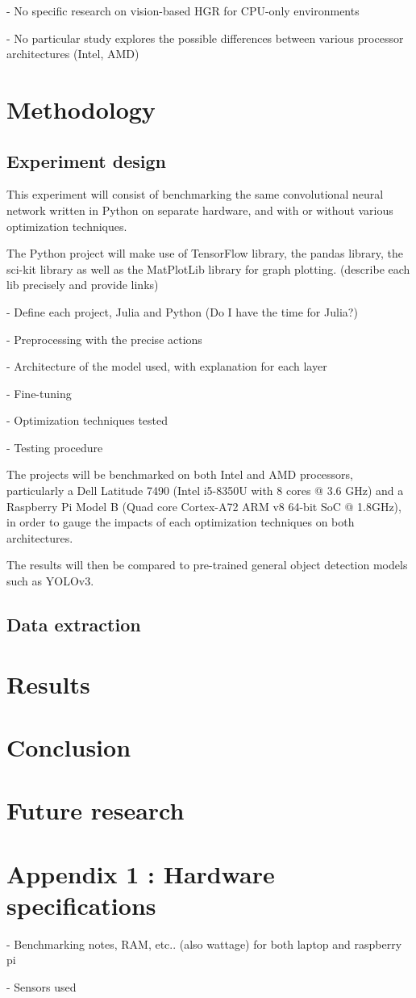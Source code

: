 \documentclass[12pt]{article}
\begin{document}
  - No specific research on vision-based HGR for CPU-only environments

  - No particular study explores the possible differences between various processor architectures (Intel, AMD)

  \section{Methodology}

  \subsection{Experiment design}

  This experiment will consist of benchmarking the same convolutional neural network written in Python on separate hardware, and with or without various optimization techniques.

  The Python project will make use of TensorFlow library, the pandas library, the sci-kit library as well as the MatPlotLib library for graph plotting.
  (describe each lib precisely and provide links)

  - Define each project, Julia and Python (Do I have the time for Julia?)

  - Preprocessing with the precise actions

  - Architecture of the model used, with explanation for each layer

  - Fine-tuning

  - Optimization techniques tested

  - Testing procedure

  The projects will be benchmarked on both Intel and AMD processors, particularly a Dell Latitude 7490 (Intel i5-8350U with 8 cores @ 3.6 GHz) and a Raspberry Pi Model B (Quad core Cortex-A72 ARM v8 64-bit SoC @ 1.8GHz), in order to gauge the impacts of each optimization techniques on both architectures.

  The results will then be compared to pre-trained general object detection models such as YOLOv3.

  \subsection{Data extraction}

  \section{Results}

  \section{Conclusion}

  \section{Future research}

  \section{Appendix 1 : Hardware specifications}

  - Benchmarking notes, RAM, etc.. (also wattage) for both laptop and raspberry pi

  - Sensors used
\end{document}
